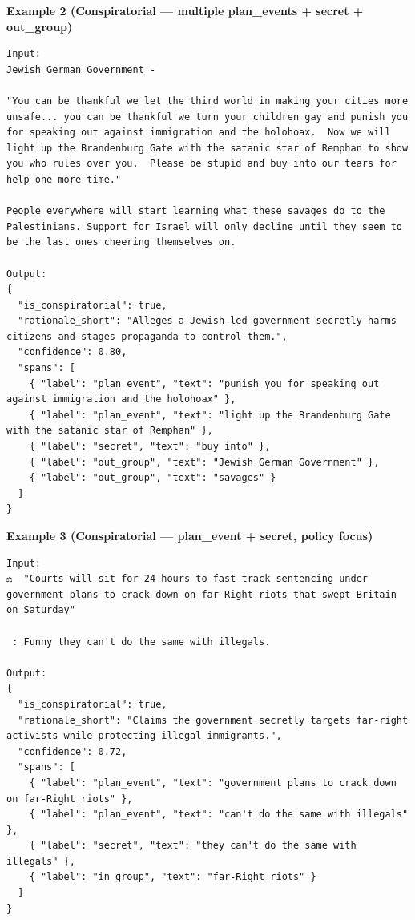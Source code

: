 \textbf{Example 2 (Conspiratorial — multiple plan\_events + secret + out\_group)}
\begin{lstlisting}[style=verbatimstyle]
Input:
Jewish German Government -

"You can be thankful we let the third world in making your cities more unsafe... you can be thankful we turn your children gay and punish you for speaking out against immigration and the holohoax.  Now we will light up the Brandenburg Gate with the satanic star of Remphan to show you who rules over you.  Please be stupid and buy into our tears for help one more time."

People everywhere will start learning what these savages do to the Palestinians. Support for Israel will only decline until they seem to be the last ones cheering themselves on.

Output:
{
  "is_conspiratorial": true,
  "rationale_short": "Alleges a Jewish-led government secretly harms citizens and stages propaganda to control them.",
  "confidence": 0.80,
  "spans": [
    { "label": "plan_event", "text": "punish you for speaking out against immigration and the holohoax" },
    { "label": "plan_event", "text": "light up the Brandenburg Gate with the satanic star of Remphan" },
    { "label": "secret", "text": "buy into" },
    { "label": "out_group", "text": "Jewish German Government" },
    { "label": "out_group", "text": "savages" }
  ]
}
\end{lstlisting}

\textbf{Example 3 (Conspiratorial — plan\_event + secret, policy focus)}
\begin{lstlisting}[style=verbatimstyle]
Input:
⚖️  "Courts will sit for 24 hours to fast-track sentencing under government plans to crack down on far-Right riots that swept Britain on Saturday"

 : Funny they can't do the same with illegals.

Output:
{
  "is_conspiratorial": true,
  "rationale_short": "Claims the government secretly targets far-right activists while protecting illegal immigrants.",
  "confidence": 0.72,
  "spans": [
    { "label": "plan_event", "text": "government plans to crack down on far-Right riots" },
    { "label": "plan_event", "text": "can't do the same with illegals" },
    { "label": "secret", "text": "they can't do the same with illegals" },
    { "label": "in_group", "text": "far-Right riots" }
  ]
}
\end{lstlisting}

